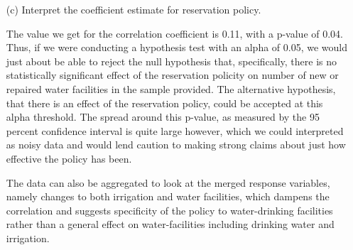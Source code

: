 \documentclass[12pt,letterpaper]{article}
\begin{document}
\begin{enumerate}
	\newpage
	\item [(c)] Interpret the coefficient estimate for reservation policy. 
	
	The value we get for the correlation coefficient is 0.11, with a p-value of 0.04. Thus, if we were conducting a hypothesis test with an alpha of 0.05, we would just about be able to reject the null hypothesis that, specifically, there is no statistically significant effect of the reservation policity on number of new or repaired water facilities in the sample provided. The alternative hypothesis, that there is an effect of the reservation policy, could be accepted at this alpha threshold. The spread around this p-value, as measured by the 95 percent confidence interval is quite large however, which we could interpreted as noisy data and would lend caution to making strong claims about just how effective the policy has been.
	
	The data can also be aggregated to look at the merged response variables, namely changes to both irrigation and water facilities, which dampens the correlation and suggests specificity of the policy to water-drinking facilities rather than a general effect on water-facilities including drinking water and irrigation.
	
\end{enumerate}
\end{document}

